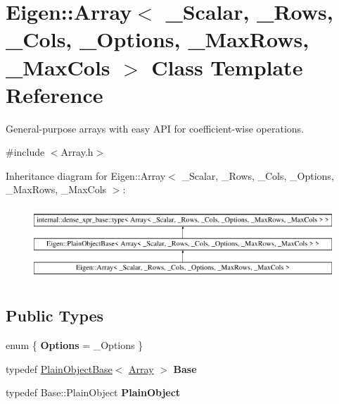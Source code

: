 \hypertarget{class_eigen_1_1_array}{}\section{Eigen\+::Array$<$ \+\_\+\+Scalar, \+\_\+\+Rows, \+\_\+\+Cols, \+\_\+\+Options, \+\_\+\+Max\+Rows, \+\_\+\+Max\+Cols $>$ Class Template Reference}
\label{class_eigen_1_1_array}


General-\/purpose arrays with easy A\+PI for coefficient-\/wise operations.  




{\ttfamily \#include $<$Array.\+h$>$}

Inheritance diagram for Eigen\+::Array$<$ \+\_\+\+Scalar, \+\_\+\+Rows, \+\_\+\+Cols, \+\_\+\+Options, \+\_\+\+Max\+Rows, \+\_\+\+Max\+Cols $>$\+:\begin{figure}[H]
\begin{center}
\leavevmode
\includegraphics[height=2.814070cm]{class_eigen_1_1_array}
\end{center}
\end{figure}
\subsection*{Public Types}
\begin{DoxyCompactItemize}
\item 
\mbox{\label{class_eigen_1_1_array_a488f87791664320a06fa2e1bf7f376f1}} 
enum \{ {\bfseries Options} = \+\_\+\+Options
 \}
\item 
\mbox{\label{class_eigen_1_1_array_a2482d54f7eb9b935156dadc665fe8b65}} 
typedef \mbox{\hyperlink{class_eigen_1_1_plain_object_base}{Plain\+Object\+Base}}$<$ \mbox{\hyperlink{class_eigen_1_1_array}{Array}} $>$ {\bfseries Base}
\item 
\mbox{\label{class_eigen_1_1_array_a8d4364c2b1f0a8268868e979c6116b7e}} 
typedef Base\+::\+Plain\+Object {\bfseries Plain\+Object}
\end{DoxyCompactItemize}
